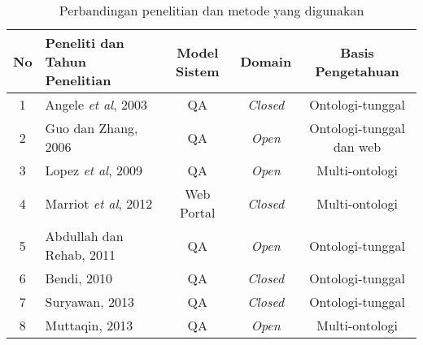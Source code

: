\begin{landscape}
\begin{table}[h]
	\caption{Perbandingan penelitian dan metode yang digunakan}
	\label{table:perbandingan_penelitian}
	\begin{tabularx}{\linewidth}{|c|>{\centering\setlength}X|c|c|c|}
		\hline
		No & Peneliti dan Tahun Penelitian & Model Sistem & Domain & Basis Pengetahuan \\
		\hline
		1 & Angele \emph{et al}, 2003 & QA & \emph{Closed} & Ontologi-tunggal \\
		\hline
		2 & Guo dan Zhang, 2006 & QA & \emph{Open} & Ontologi-tunggal dan web \\
		\hline
		3 & Lopez \emph{et al}, 2009 & QA & \emph{Open} & Multi-ontologi \\
		\hline
		4 & Marriot \emph{et al}, 2012 & Web Portal & \emph{Closed} & Multi-ontologi \\
		\hline
		5 & Abdullah dan Rehab, 2011 & QA & \emph{Open} & Ontologi-tunggal \\
		\hline
		6 & Bendi, 2010 & QA & \emph{Closed} & Ontologi-tunggal \\
		\hline
		7 & Suryawan, 2013 & QA & \emph{Closed} & Ontologi-tunggal \\
		\hline
		8 & Muttaqin, 2013 & QA & \emph{Open} & Multi-ontologi \\
		\hline
	\end{tabularx}
\end{table}
\end{landscape}